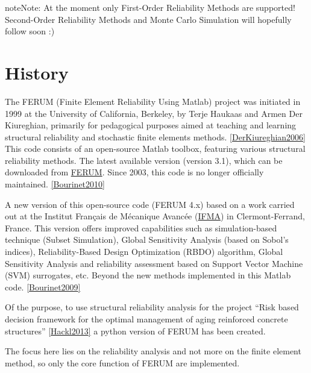\documentclass[letterpaper,10pt,english]{sphinxmanual}
\begin{document}
\begin{notice}{note}{Note:}
At the moment only First-Order Reliability Methods are supported!
Second-Order Reliability Methods and Monte Carlo Simulation will hopefully
follow soon :)
\end{notice}


\section{History}
\label{README:history}
The FERUM (Finite Element Reliability Using Matlab) project was initiated in
1999 at the University of California, Berkeley, by Terje Haukaas and Armen Der
Kiureghian, primarily for pedagogical purposes aimed at teaching and learning
structural reliability and stochastic finite elements methods. {\hyperref[references:derkiureghian2006]{{[}DerKiureghian2006{]}}}
This code consists of an open-source Matlab toolbox, featuring various
structural reliability methods. The latest available version (version 3.1),
which can be downloaded from \href{http://www.ce.berkeley.edu/projects/ferum/}{FERUM}. Since 2003, this code is no longer
officially maintained. {\hyperref[references:bourinet2010]{{[}Bourinet2010{]}}}

A new version of this open-source code (FERUM 4.x) based on a work carried out
at the Institut Français de Mécanique Avancée (\href{http://www.ifma.fr/Recherche/Labos/FERUM}{IFMA}) in Clermont-Ferrand,
France. This version offers improved capabilities such as simulation-based
technique (Subset Simulation), Global Sensitivity Analysis (based on Sobol’s
indices), Reliability-Based Design Optimization (RBDO) algorithm, Global
Sensitivity Analysis and reliability assessment based on Support Vector
Machine (SVM) surrogates, etc. Beyond the new methods implemented in this
Matlab code. {\hyperref[references:bourinet2009]{{[}Bourinet2009{]}}}

Of the purpose, to use structural reliability analysis for the project ``Risk
based decision framework for the optimal management of aging reinforced
concrete structures'' {\hyperref[references:hackl2013]{{[}Hackl2013{]}}} a python version of FERUM has been created.

The focus here lies on the reliability analysis and not more on the finite
element method, so only the core function of FERUM are implemented.
\end{document}
